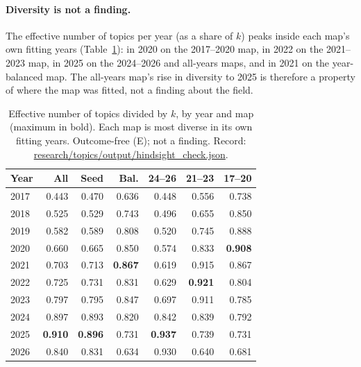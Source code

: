 \paragraph{Diversity is not a finding.} The effective number of topics per year (as a share of $k$) peaks inside
each map's own fitting years (Table~\ref{tab:app-div}): in 2020 on the 2017--2020 map, in 2022 on the 2021--2023 map,
in 2025 on the 2024--2026 and all-years maps, and in 2021 on the year-balanced map. The all-years map's rise in
diversity to 2025 is therefore a property of where the map was fitted, not a finding about the field.

\begin{table}[t]
\centering\footnotesize
\setlength{\tabcolsep}{3.5pt}
\begin{tabular}{@{}lrrrrrr@{}}
\toprule
Year & All & Seed & Bal. & 24--26 & 21--23 & 17--20 \\
\midrule
2017 & 0.443 & 0.470 & 0.636 & 0.448 & 0.556 & 0.738 \\
2018 & 0.525 & 0.529 & 0.743 & 0.496 & 0.655 & 0.850 \\
2019 & 0.582 & 0.589 & 0.808 & 0.520 & 0.745 & 0.888 \\
2020 & 0.660 & 0.665 & 0.850 & 0.574 & 0.833 & \textbf{0.908} \\
2021 & 0.703 & 0.713 & \textbf{0.867} & 0.619 & 0.915 & 0.867 \\
2022 & 0.725 & 0.731 & 0.831 & 0.629 & \textbf{0.921} & 0.804 \\
2023 & 0.797 & 0.795 & 0.847 & 0.697 & 0.911 & 0.785 \\
2024 & 0.897 & 0.893 & 0.820 & 0.842 & 0.839 & 0.792 \\
2025 & \textbf{0.910} & \textbf{0.896} & 0.731 & \textbf{0.937} & 0.739 & 0.731 \\
2026 & 0.840 & 0.831 & 0.634 & 0.930 & 0.640 & 0.681 \\
\bottomrule
\end{tabular}
\caption{Effective number of topics divided by $k$, by year and map (maximum in bold). Each map is most diverse in
its own fitting years. Outcome-free (E); not a finding. Record:
\url{research/topics/output/hindsight_check.json}.}
\label{tab:app-div}
\end{table}

